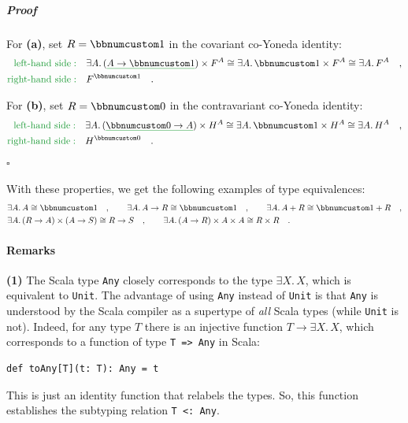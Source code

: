 \subparagraph{Proof}

For \textbf{(a)}, set $R=\bbnum 1$ in the covariant co-Yoneda identity:
\begin{align*}
{\color{greenunder}\text{left-hand side}:}\quad & \exists A.\,(\gunderline{A\rightarrow\bbnum 1})\times F^{A}\cong\exists A.\,\bbnum 1\times F^{A}\cong\exists A.\,F^{A}\quad,\\
{\color{greenunder}\text{right-hand side}:}\quad & F^{\bbnum 1}\quad.
\end{align*}

For \textbf{(b)}, set $R=\bbnum 0$ in the contravariant co-Yoneda
identity:
\begin{align*}
{\color{greenunder}\text{left-hand side}:}\quad & \exists A.\,(\gunderline{\bbnum 0\rightarrow A})\times H^{A}\cong\exists A.\,\bbnum 1\times H^{A}\cong\exists A.\,H^{A}\quad,\\
{\color{greenunder}\text{right-hand side}:}\quad & H^{\bbnum 0}\quad.
\end{align*}
 $\square$

With these properties, we get the following examples of type equivalences:
\begin{align*}
 & \exists A.\,A\cong\bbnum 1\quad,\quad\quad\exists A.\,A\rightarrow R\cong\bbnum 1\quad,\quad\quad\exists A.\,A+R\cong\bbnum 1+R\quad,\\
 & \exists A.\,(R\rightarrow A)\times(A\rightarrow S)\cong R\rightarrow S\quad,\quad\quad\exists A.\,(A\rightarrow R)\times A\times A\cong R\times R\quad.
\end{align*}


\paragraph{Remarks}

\textbf{(1)} The Scala type \lstinline!Any! closely corresponds to
the type $\exists X.\,X$, which is equivalent to \lstinline!Unit!.
The advantage of using \lstinline!Any! instead of \lstinline!Unit!
is that \lstinline!Any! is understood by the Scala compiler as a
supertype of \emph{all} Scala types (while \lstinline!Unit! is not).
Indeed, for any type $T$ there is an injective function $T\rightarrow\exists X.\,X$,
which corresponds to a function of type \lstinline!T => Any! in Scala:
\begin{lstlisting}
def toAny[T](t: T): Any = t
\end{lstlisting}
 This is just an identity function that relabels the types. So, this
function establishes the subtyping relation \lstinline!T <: Any!. 

